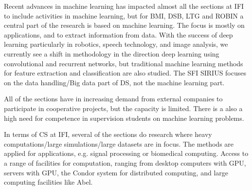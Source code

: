 \documentclass[a4paper,10pt]{article}
\begin{document}
Recent advances in machine learning has impacted almost all the sections at IFI to include activities in machine learning, but for BMI, DSB, LTG and ROBIN a central part of the research is based on machine learning. The focus is mostly on applications, and to extract information from data.
With the success of deep learning particularly in robotics, speech technology, and image analysis, we currently see a shift in methodology in the direction deep learning using convolutional and recurrent networks, but traditional machine learning methods for feature extraction and classification are also studied.
The SFI SIRIUS focuses on the data handling/Big data part of DS, not the machine learning part.

All of the sections have in increasing demand from external companies to participate in cooperative projects, but the capacity is limited. There is a also a high need for competence in supervision students on machine learning problems.

In terms of CS at IFI, several of the sections do research where heavy computations/large simulations/large datasets are in focus. The methods are applied for applications, e.g. signal processing or biomedical computing. Access to a range of facilities for computation, ranging from desktop computers with GPU, servers with GPU, the Condor system for distributed computing, and large computing facilities like Abel.
\end{document}
